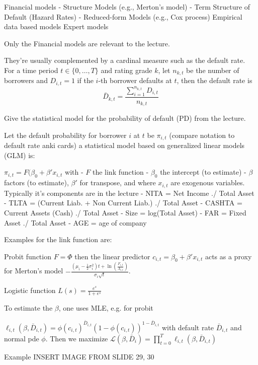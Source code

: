 Financial models
- Structure Models (e.g., Merton's model)
- Term Structure of Default (Hazard Rates)
- Reduced-form Models (e.g., Cox process)
Empirical data based models
Expert models

Only the Financial models are relevant to the lecture.

They're usually complemented by a cardinal measure such as the default rate.
For a time period \( t \in \{0, \dots, T\} \) and rating grade \( k \), let \( n_{k,t} \) 
be the number of borrowers and \( D_{i, t} = 1 \) if the \( i \)-th borrower defaults at \( t \), then
the default rate is
\[ \bar{D}_{k,t} = \frac{\sum_{i=1}^{n_{k,t}}D_{i,t}}{n_{k,t}} \]


Give the statistical model for the probability of default (PD) from the lecture.

Let the default probability for borrower \( i \) at \( t \) be \( \pi_{i,t} \) (compare notation to default rate anki cards)
a statistical model based on generalized linear models (GLM) is:

\( \pi_{i,t} = F(\beta_0 + \beta'x_{i,t}\)
with
- \( F \) the link function
- \( \beta_0 \) the intercept (to estimate) 
- \( \beta \) factors (to estimate), \( \beta' \) for transpose,
and where \( x_{i,t} \) are exogenous variables. Typically it's components are in the lecture
- NITA = Net Income ./ Total Asset
- TLTA = (Current Liab. + Non Current Liab.) ./ Total Asset
- CASHTA = Current Assets (Cash) ./ Total Asset
- Size = log(Total Asset)
- FAR = Fixed Asset ./ Total Asset
- AGE = age of company

Examples for the link function are:

Probit function
\( F = \Phi \) then the linear predictor \( c_{i,t} = \beta_0 + \beta'x_{i,t} \) acts as a proxy
for Merton's model \( - \frac{(\mu_i - \frac{1}{2}\sigma^2_i)t + \ln(\frac{F_{i,t}}{A_{i,t}})}{\sigma_i\sqrt{t}} \).

Logistic function
\( L(s) = \frac{e^s}{1 + e^s} \)

To estimate the \( \beta \), one uses MLE, e.g. for probit

\( \ell_{i,t}(\beta, \bar{D}_{i,t}) = \phi(c_{i,t})^{\bar{D}_{i,t}}(1 - \phi(c_{i,t}))^{1 - \bar{D}_{i,t}} \)
with default rate \( \bar{D}_{i,t} \) and normal pde \( \phi \).
Then we maximize
\( \mathcal{L}(\beta, \bar{D}_i) = \prod_{t=0}^T \ell_{i,t}(\beta, \bar{D}_{i,t})\)

Example
INSERT IMAGE FROM SLIDE 29, 30 




